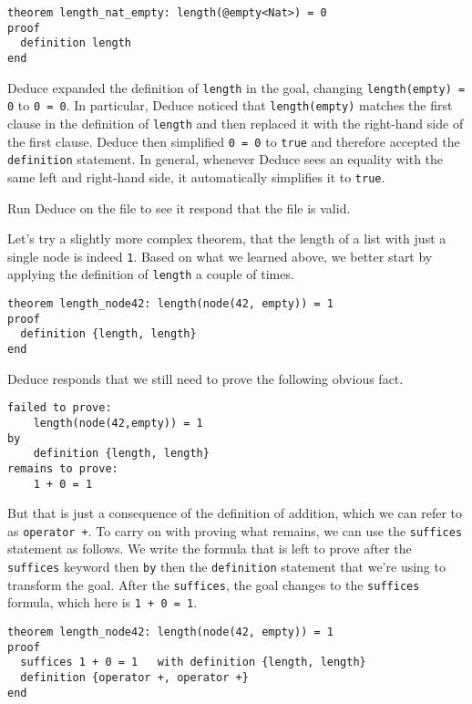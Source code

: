 \documentclass[12pt]{article}
\begin{document}
\begin{verbatim}
theorem length_nat_empty: length(@empty<Nat>) = 0
proof
  definition length
end
\end{verbatim}

\noindent Deduce expanded the definition of \texttt{length} in the
goal, changing \texttt{length(empty) = 0} to \texttt{0 = 0}. In
particular, Deduce noticed that \texttt{length(empty)} matches the
first clause in the definition of \texttt{length} and then replaced it
with the right-hand side of the first clause. Deduce then simplified
\texttt{0 = 0} to \texttt{true} and therefore accepted the
\texttt{definition} statement. In general, whenever Deduce sees an
equality with the same left and right-hand side, it automatically
simplifies it to \texttt{true}.

Run Deduce on the file to see it respond that the file is valid.

Let's try a slightly more complex theorem, that the length
of a list with just a single node is indeed \texttt{1}. Based
on what we learned above, we better start by applying the
definition of \texttt{length} a couple of times.

\begin{verbatim}
theorem length_node42: length(node(42, empty)) = 1
proof
  definition {length, length}
end
\end{verbatim}

\noindent Deduce responds that we still need to prove the following
obvious fact.

\begin{verbatim}
failed to prove:
    length(node(42,empty)) = 1
by
    definition {length, length}
remains to prove:
    1 + 0 = 1
\end{verbatim}

\noindent But that is just a consequence of the definition of
addition, which we can refer to as \texttt{operator +}.  To carry on
with proving what remains, we can use the \texttt{suffices} statement
as follows. We write the formula that is left to prove after the
\texttt{suffices} keyword then \texttt{by} then the
\texttt{definition} statement that we're using to transform the goal.
After the \texttt{suffices}, the goal changes to the \texttt{suffices}
formula, which here is \texttt{1 + 0 = 1}.

\begin{verbatim}
theorem length_node42: length(node(42, empty)) = 1
proof
  suffices 1 + 0 = 1   with definition {length, length}
  definition {operator +, operator +}
end
\end{verbatim}
\end{document}
